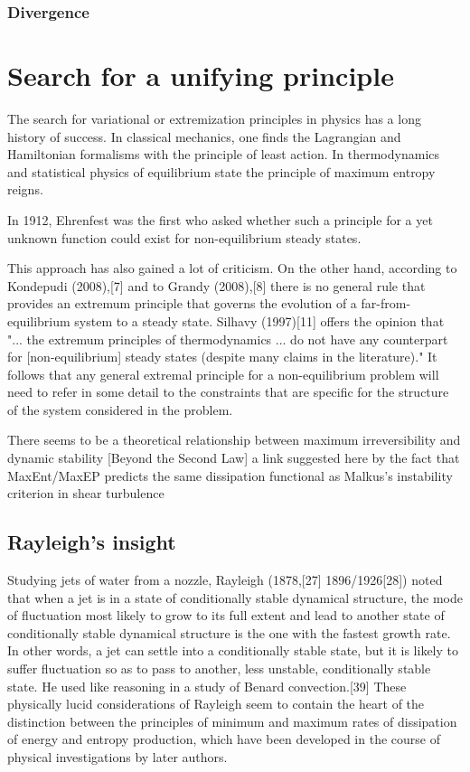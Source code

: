 \documentclass[a4paper,12pt,nofootinbib]{article}
\begin{document}
\subsubsection{Divergence}




\section{Search for a unifying principle}

The search for variational or extremization principles in physics has a long history of success. In classical mechanics, one finds the Lagrangian and Hamiltonian formalisms with the principle of least action. In thermodynamics and statistical physics of equilibrium state the principle of maximum entropy reigns. 

In 1912, Ehrenfest was the first who asked whether such a principle for a yet unknown function could exist for non-equilibrium steady states. 

This approach has also gained a lot of criticism.
On the other hand, according to Kondepudi (2008),[7] and to Grandy (2008),[8] there is no general rule that provides an extremum principle that governs the evolution of a far-from-equilibrium system to a steady state. 
Silhavy (1997)[11] offers the opinion that "... the extremum principles of thermodynamics ... do not have any counterpart for [non-equilibrium] steady states (despite many claims in the literature)." It follows that any general extremal principle for a non-equilibrium problem will need to refer in some detail to the constraints that are specific for the structure of the system considered in the problem.

There seems to be a theoretical relationship between maximum irreversibility and dynamic stability [Beyond the Second Law] a link suggested here by the fact that MaxEnt/MaxEP predicts the same dissipation functional as Malkus's instability criterion in shear turbulence

\subsection{Rayleigh's insight}
Studying jets of water from a nozzle, Rayleigh (1878,[27] 1896/1926[28]) noted that when a jet is in a state of conditionally stable dynamical structure, the mode of fluctuation most likely to grow to its full extent and lead to another state of conditionally stable dynamical structure is the one with the fastest growth rate. In other words, a jet can settle into a conditionally stable state, but it is likely to suffer fluctuation so as to pass to another, less unstable, conditionally stable state. He used like reasoning in a study of Benard convection.[39] These physically lucid considerations of Rayleigh seem to contain the heart of the distinction between the principles of minimum and maximum rates of dissipation of energy and entropy production, which have been developed in the course of physical investigations by later authors.
\end{document}

